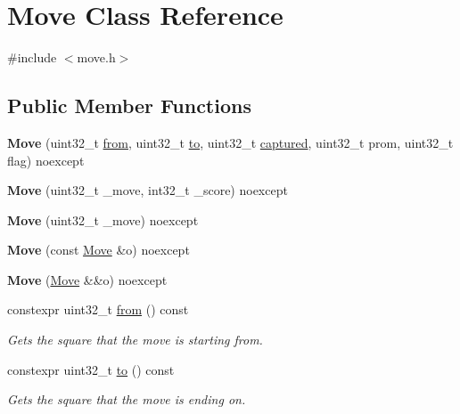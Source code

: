 \hypertarget{classMove}{}\section{Move Class Reference}
\label{classMove}


{\ttfamily \#include $<$move.\+h$>$}

\subsection*{Public Member Functions}
\begin{DoxyCompactItemize}
\item 
\mbox{\label{classMove_ac63ab436cc90ca3b83f6bf9328745410}} 
{\bfseries Move} (uint32\+\_\+t \mbox{\hyperlink{classMove_a5a16b2160e1cb66cde53dd6251616243}{from}}, uint32\+\_\+t \mbox{\hyperlink{classMove_a14f68402d1ad19b441730a7f7d703362}{to}}, uint32\+\_\+t \mbox{\hyperlink{classMove_a5a8811a7e6ee7fe36675d49038f2ea2b}{captured}}, uint32\+\_\+t prom, uint32\+\_\+t flag) noexcept
\item 
\mbox{\label{classMove_a880d0197342959b353fd6de7d0cae16f}} 
{\bfseries Move} (uint32\+\_\+t \+\_\+move, int32\+\_\+t \+\_\+score) noexcept
\item 
\mbox{\label{classMove_a023d4469f67a68d9d39ce24b95031ab8}} 
{\bfseries Move} (uint32\+\_\+t \+\_\+move) noexcept
\item 
\mbox{\label{classMove_a29a98334b21446eba8df130c2521b13f}} 
{\bfseries Move} (const \mbox{\hyperlink{classMove}{Move}} \&o) noexcept
\item 
\mbox{\label{classMove_a84c4266bc47d32d7c07a72f76c2d2e46}} 
{\bfseries Move} (\mbox{\hyperlink{classMove}{Move}} \&\&o) noexcept
\item 
constexpr uint32\+\_\+t \mbox{\hyperlink{classMove_a5a16b2160e1cb66cde53dd6251616243}{from}} () const
\begin{DoxyCompactList}\small\item\em Gets the square that the move is starting from. \end{DoxyCompactList}\item 
constexpr uint32\+\_\+t \mbox{\hyperlink{classMove_a14f68402d1ad19b441730a7f7d703362}{to}} () const
\begin{DoxyCompactList}\small\item\em Gets the square that the move is ending on. \end{DoxyCompactList}\item 

\end{DoxyCompactItemize}
